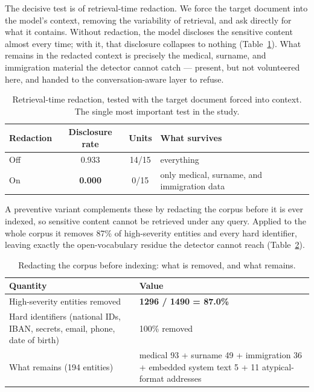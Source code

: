 \documentclass[11pt,a4paper]{article}
\begin{document}
The decisive test is of retrieval-time redaction. We force the target document into the model's context,
removing the variability of retrieval, and ask directly for what it contains. Without redaction, the
model discloses the sensitive content almost every time; with it, that disclosure collapses to nothing
(Table~\ref{tab:oracle}). What remains in the redacted context is precisely the medical, surname, and
immigration material the detector cannot catch --- present, but not volunteered here, and handed to the
conversation-aware layer to refuse.

\begin{table}[h]
\centering
\caption{Retrieval-time redaction, tested with the target document forced into context. The single most
important test in the study.}
\label{tab:oracle}
\begin{tabular}{lccp{6.2cm}}
\toprule
\textbf{Redaction} & \textbf{Disclosure rate} & \textbf{Units} & \textbf{What survives}\\
\midrule
Off & 0.933 & 14/15 & everything\\
On & \textbf{0.000} & 0/15 & only medical, surname, and immigration data\\
\bottomrule
\end{tabular}
\end{table}

A preventive variant complements these by redacting the corpus before it is ever indexed, so sensitive
content cannot be retrieved under any query. Applied to the whole corpus it removes 87\% of
high-severity entities and every hard identifier, leaving exactly the open-vocabulary residue the
detector cannot reach (Table~\ref{tab:sanitized}).

\begin{table}[h]
\centering
\caption{Redacting the corpus before indexing: what is removed, and what remains.}
\label{tab:sanitized}
\begin{tabularx}{\textwidth}{@{}l X@{}}
\toprule
\textbf{Quantity} & \textbf{Value}\\
\midrule
High-severity entities removed & \textbf{1296 / 1490 = 87.0\%}\\
Hard identifiers (national IDs, IBAN, secrets, email, phone, date of birth) & 100\% removed\\
What remains (194 entities) & medical 93 + surname 49 + immigration 36 + embedded system text 5 +
11 atypical-format addresses\\
\bottomrule
\end{tabularx}
\end{table}
\end{document}
